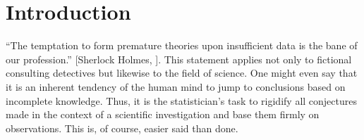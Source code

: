 
\chapter{Introduction}

\enquote{The temptation to form premature theories upon insufficient data is 
the bane of our profession.} [Sherlock Holmes, \citealt{Holmes}]. This 
statement applies not only to fictional consulting detectives but likewise to 
the field of science. One might even say that it is an inherent tendency of 
the human mind to jump to conclusions based on incomplete knowledge. Thus, it
is the statistician's task to rigidify all conjectures made in the context of
a scientific investigation and base them firmly on observations. This is, of
course, easier said than done.

